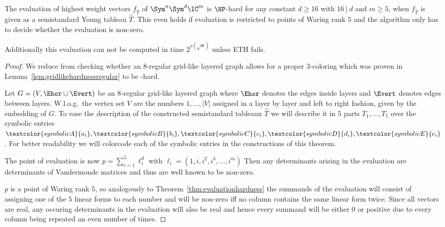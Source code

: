 \begin{theorem}
    \label{thm:semistdhardness}
    The evaluation of highest weight vectors $f_{\hat{T}}$ of $\Sym^n\Sym^d \IC^m$ is $\NP$-hard for any constant $d \geq 16$ with $16~|~d$  and $m \geq 5$, when $f_{\hat{T}}$ is given as a semistandard Young tableau $\hat{T}$.
    This even holds if evaluation is restricted to points of Waring rank $5$ and the algorithm only has to decide whether the evaluation is non-zero.

    Additionally this evaluation can not be computed in time $2^{o(\sqrt{n})}$ unless ETH fails.
\end{theorem}
\begin{proof}

    We reduce from checking whether an $8$-regular grid-like layered graph allows for a proper $3$-coloring which was proven in Lemma~\ref{lem:gridlikehardnessregular} to be \NP-hard.

    Let $G = (V, \Ehor \cup \Evert)$ be an $8$-regular grid-like layered graph where $\Ehor$ denotes the edges inside layers and $\Evert$ denotes edges between layers.
    W.l.o.g.\ the vertex set $V$ are the numbers $1, \ldots, |V|$ assigned in a layer by layer and left to right fashion, given by the embedding of $G$.
    To ease the description of the constructed semistandard tableaux $\hat{T}$ we will describe it in $5$ parts $T_1, \ldots, T_5$ over the symbolic entries $\textcolor{symbolicA}{a_i}, \textcolor{symbolicB}{b_i}, \textcolor{symbolicC}{c_i}, \textcolor{symbolicD}{d_i}, \textcolor{symbolicE}{e_i}$.
    For better readability we will colorcode each of the symbolic entries in the constructions of this theorem.

    The point of evaluation is now $p = \sum_{i=1}^5 \ell_i^d$ with $\ell_i = (1, i, i^2, i^3, \ldots, i^m)$
    Then any determinants arising in the evaluation are determinants of Vandermonde matrices and thus are well known to be non-zero.
    
    $p$ is a point of Waring rank $5$, so analogously to Theorem~\ref{thm:evaluationhardness} the summands of the evaluation will consist of assigning one of the $5$ linear forms to each number and will be non-zero iff no column contains the same linear form twice.
    Since all vectors are real, any occuring determinants in the evaluation will also be real and hence every summand will be either $0$ or positive due to every column being repeated an even number of times.


\end{proof}
